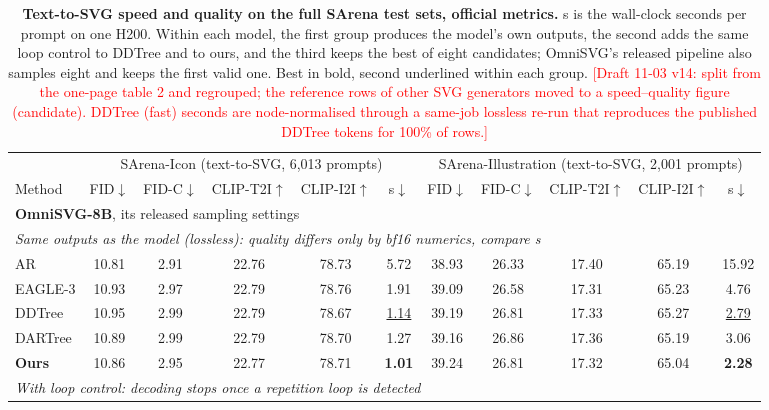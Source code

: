 \begin{table}[t]
\caption{\textbf{Text-to-SVG speed and quality on the full SArena test sets, official metrics.} s is the wall-clock seconds per prompt on one H200. Within each model, the first group produces the model's own outputs, the second adds the same loop control to DDTree and to ours, and the third keeps the best of eight candidates; OmniSVG's released pipeline also samples eight and keeps the first valid one. Best in bold, second underlined within each group. \textcolor{red}{[Draft 11-03 v14: split from the one-page table 2 and regrouped; the reference rows of other SVG generators moved to a speed--quality figure (candidate). DDTree (fast) seconds are node-normalised through a same-job lossless re-run that reproduces the published DDTree tokens for 100\% of rows.]}}
\label{tab:quality-t2s}\label{tab:quality}
\centering
\small
\setlength{\tabcolsep}{2.6pt}
\begin{tabular*}{\textwidth}{@{\extracolsep{\fill}}l*{10}{c}@{}}
\toprule
 & \multicolumn{5}{c}{SArena-Icon (text-to-SVG, 6,013 prompts)} & \multicolumn{5}{c}{SArena-Illustration (text-to-SVG, 2,001 prompts)} \\
\cmidrule(lr){2-6}\cmidrule(lr){7-11}
Method & FID$\downarrow$ & FID-C$\downarrow$ & CLIP-T2I$\uparrow$ & CLIP-I2I$\uparrow$ & s$\downarrow$ & FID$\downarrow$ & FID-C$\downarrow$ & CLIP-T2I$\uparrow$ & CLIP-I2I$\uparrow$ & s$\downarrow$ \\
\midrule
\multicolumn{11}{l}{\textbf{OmniSVG-8B}, its released sampling settings} \\
\multicolumn{11}{l}{\hspace{0.6em}\textit{Same outputs as the model (lossless): quality differs only by bf16 numerics, compare s}} \\
AR & 10.81 & 2.91 & 22.76 & 78.73 & 5.72 & 38.93 & 26.33 & 17.40 & 65.19 & 15.92 \\
EAGLE-3 & 10.93 & 2.97 & 22.79 & 78.76 & 1.91 & 39.09 & 26.58 & 17.31 & 65.23 & 4.76 \\
DDTree & 10.95 & 2.99 & 22.79 & 78.67 & \underline{1.14} & 39.19 & 26.81 & 17.33 & 65.27 & \underline{2.79} \\
DARTree & 10.89 & 2.99 & 22.79 & 78.70 & 1.27 & 39.16 & 26.86 & 17.36 & 65.19 & 3.06 \\
\textbf{Ours} & 10.86 & 2.95 & 22.77 & 78.71 & \textbf{1.01} & 39.24 & 26.81 & 17.32 & 65.04 & \textbf{2.28} \\
\multicolumn{11}{l}{\hspace{0.6em}\textit{With loop control: decoding stops once a repetition loop is detected}} \\

\end{tabular*}
\end{table}
